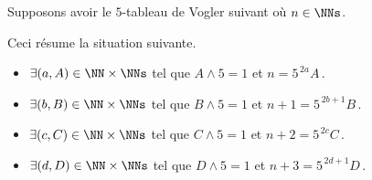 

\begin{example}
	Supposons avoir le $5$-tableau de Vogler suivant où $n \in \NNs$.

	\begin{center}
	\end{center}
	
	Ceci résume la situation suivante. 
	\begin{itemize}
		\item $\exists (a, A) \in \NN \times \NNs$
		      tel que $A \wedge 5 = 1$ et $n     = 5^{\,2a}     A$\,.
		
		\item $\exists (b, B) \in \NN \times \NNs$
		      tel que $B \wedge 5 = 1$ et $n + 1 = 5^{\,2b + 1} B$\,.
		
		\item $\exists (c, C) \in \NN \times \NNs$
		      tel que $C \wedge 5 = 1$ et $n + 2 = 5^{\,2c}     C$\,.
		
		\item $\exists (d, D) \in \NN \times \NNs$
		      tel que $D \wedge 5 = 1$ et $n + 3 = 5^{\,2d + 1} D$\,.
	\end{itemize}
\end{example}




